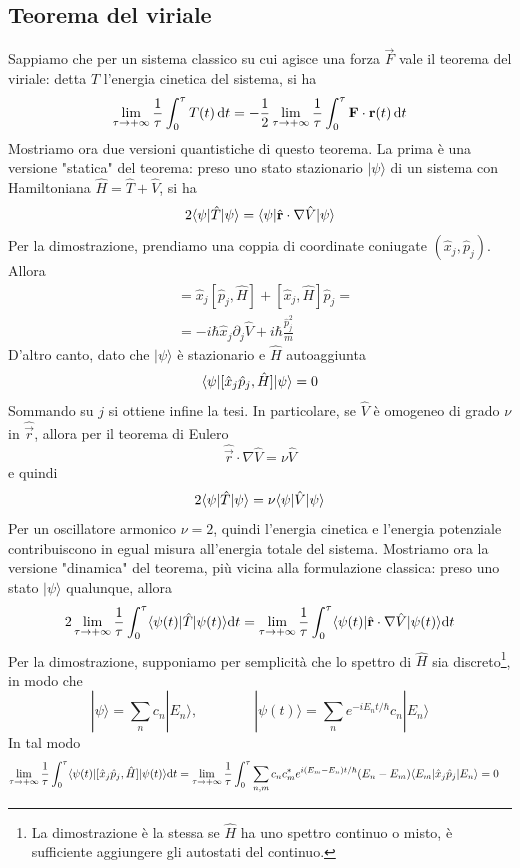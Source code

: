 \documentclass[a4paper, 11pt]{article}
\newcommand{\ham}{\hat{H}}
\renewcommand{\ket}[1]{| #1\rangle}
\begin{document}
\subsection{Teorema del viriale}
Sappiamo che per un sistema classico su cui agisce una forza $\vec{F}$ vale il teorema del viriale: detta $T$ l'energia cinetica del sistema, si ha
\[\lim\limits_{\tau\to+\infty}\frac{1}{\tau}\int_{0}^{\tau}T(t)\,\mathrm{d} t=-\frac{1}{2}\lim\limits_{\tau\to+\infty}\frac{1}{\tau}\int_{0}^{\tau}\mathbf{F}\cdot\mathbf{r}(t)\,\mathrm{d} t\]
Mostriamo ora due versioni quantistiche di questo teorema. La prima è una versione "statica" del teorema: preso uno stato stazionario $\ket\psi$ di un sistema con Hamiltoniana $\ham=\hat T+\hat V$, si ha
\[2\braketop{\psi}{\hat T}{\psi}=\braketop{\psi}{\hat {\vec{r}}\cdot\nabla \hat V}{\psi}\]
Per la dimostrazione, prendiamo una coppia di coordinate coniugate $(\hat x_j,\hat p_j)$. Allora
\begin{align*}
	[\hat x_j\hat p_j,\ham]&=\hat x_j[\hat p_j,\ham]+[\hat x_j,\ham]\hat p_j=\\&=-i\hbar\hat x_j\partial_j\hat V+i\hbar \frac{\hat p_j^2}{m}
\end{align*}
D'altro canto, dato che $\ket\psi$ è stazionario e $\ham$ autoaggiunta
\[\braketop{\psi}{[\hat x_j\hat p_j,\ham]}{\psi}=0\]
Sommando su $j$ si ottiene infine la tesi. In particolare, se $\hat{V}$ è omogeneo di grado $\nu$ in $\hat{\vec{r}}$, allora per il teorema di Eulero \[\hat{\vec r}\cdot\nabla\hat{V}=\nu\hat{V}\]
e quindi
\[2\langle\psi|\hat{T}|\psi\rangle=\nu\langle\psi|\hat V|\psi\rangle\]
Per un oscillatore armonico $\nu=2$, quindi l'energia cinetica e l'energia potenziale contribuiscono in egual misura all'energia totale del sistema. Mostriamo ora la versione "dinamica" del teorema, più vicina alla formulazione classica: preso uno stato $\ket\psi$ qualunque, allora
\[2\lim\limits_{\tau\to+\infty}\frac{1}{\tau}\int_{0}^{\tau}\braketop{\psi(t)}{\hat{T}}{\psi(t)}\d t=\lim\limits_{\tau\to+\infty}\frac{1}{\tau}\int_{0}^{\tau}\braketop{\psi(t)}{\hat{\vec{r}}\cdot\nabla\hat{V}}{\psi(t)}\d t\]
Per la dimostrazione, supponiamo per semplicità che lo spettro di $\ham$ sia discreto\footnote{La dimostrazione è la stessa se $\ham$ ha uno spettro continuo o misto, è sufficiente aggiungere gli autostati del continuo.}, in modo che
\[\ket\psi=\sum_{n}c_n\ket{E_n},\qquad\qquad\ket{\psi(t)}=\sum_{n}e^{-iE_nt/\hbar}c_n\ket{E_n}\]
In tal modo
\begin{align*}
	\lim\limits_{\tau\to+\infty}\frac{1}{\tau}\int_{0}^{\tau}\braketop{\psi(t)}{[\hat{x}_j\hat{p}_j,\ham]}{\psi(t)}\d t&=\lim\limits_{\tau\to+\infty}\frac{1}{\tau}\int_{0}^{\tau}\sum_{n,m}c_nc^*_me^{i(E_m-E_n)t/\hbar}(E_n-E_m)\braketop{E_m}{\hat x_j\hat p_j}{E_n}=0
\end{align*}
\end{document}

